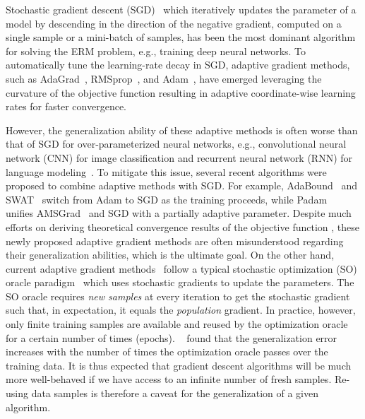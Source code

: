 \documentclass[11pt]{article}
\begin{document}
Stochastic gradient descent (SGD)~\citep{Article:Robbins_1951} which iteratively updates the parameter of a model by descending in the direction of the negative gradient, computed on a single sample or a mini-batch of samples, has been the most dominant algorithm for solving the ERM problem, e.g., training deep neural networks. 
To automatically tune the learning-rate decay in SGD, adaptive gradient methods, such as AdaGrad~\citep{Proc:Duchi_JMLR11}, RMSprop~\citep{tige12}, and Adam~\citep{Proc:Kingma_ICLR15}, have emerged leveraging the curvature of the objective function resulting in adaptive coordinate-wise learning rates for faster convergence.

However, the generalization ability of these adaptive methods is often worse than that of SGD for over-parameterized neural networks, e.g., convolutional neural network (CNN) for image classification and recurrent neural network (RNN) for language modeling~\citep{Proc:Wilson_NIPS17}. 
To mitigate this issue, several recent algorithms were proposed to combine adaptive methods with SGD.
For example, AdaBound~\citep{Proc:Luo_ICLR19} and SWAT~\citep{keso2017} switch from Adam to SGD as the training proceeds, while Padam~\citep{Proc:Chen_IJCAI20, zhta18} unifies AMSGrad~\citep{Proc:Reddi_ICLR18} and SGD with a partially adaptive parameter.  
Despite much efforts on deriving theoretical convergence results of the objective function \citep{Proc:Zaheer_NeurIPS18,Proc:Ward_ICML19, Proc:Zou_CVPR19, Proc:Chen_ICLR19}, these newly proposed adaptive gradient methods are often misunderstood regarding their generalization abilities, which is the ultimate goal.
On the other hand, current adaptive gradient methods~\citep{Proc:Duchi_JMLR11,Proc:Kingma_ICLR15,tige12, Proc:Reddi_ICLR18, Proc:Ward_ICML19} follow a typical stochastic optimization (SO) oracle paradigm~\citep{Article:Robbins_1951, Article:Ghadimi_SJO13} which uses stochastic gradients to update the parameters. 
The SO oracle requires \emph{new samples} at every iteration to get the stochastic gradient such that, in expectation, it equals the \emph{population} gradient. 
In practice, however, only finite training samples are available and reused by the optimization oracle for a certain number of times (\ie epochs). 
~\citep{Proc:Hardt_ICML16} found that the generalization error increases with the number of times the optimization oracle passes over the training data. 
It is thus expected that gradient descent algorithms will be much more well-behaved if we have access to an infinite number of fresh samples. 
Re-using data samples is therefore a caveat for the generalization of a given algorithm.
\end{document}
